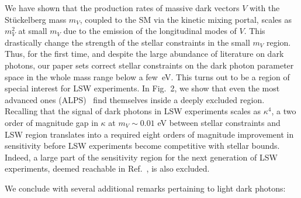 \documentclass[12pt]{article}
\begin{document}
We have shown that the production rates of massive dark vectors $V$
with the St\"uckelberg mass $m_V$, coupled to the SM via the kinetic
mixing portal, scales as $m_V^2$ at small $m_V$ due to the emission of
the longitudinal modes of $V$.  This drastically change the strength
of the stellar constraints in the small $m_V$ region.  Thus, for the
first time, and despite the large abundance of literature on dark
photons, our paper sets correct stellar constraints on the dark photon
parameter space in the whole mass range below a few~eV.  This turns
out to be a region of special interest for LSW experiments.  In
Fig.~2, we show that even the most advanced ones
(ALPS)~\cite{Ehret:2010mh} find themselves inside a deeply excluded
region.  Recalling that the signal of dark photons in LSW experiments
scales as $\kappa^4$, a two order of magnitude gap in $\kappa$ at
$m_V\sim 0.01$ eV between stellar constraints and LSW region
translates into a required eight orders of magnitude improvement in
sensitivity before LSW experiments become competitive with stellar
bounds.  Indeed, a large part of the sensitivity region for the next
generation of LSW experiments, deemed reachable in
Ref.~\cite{Redondo:2010dp}, is also excluded.

We conclude with several additional remarks pertaining to light dark
photons:
\end{document}
